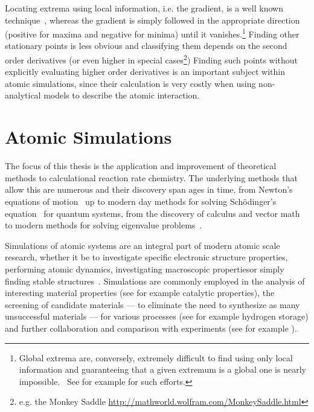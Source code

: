 Locating extrema using local information, i.e. the gradient, is a well known technique~\cite{cg-original-1952}, whereas the gradient is simply followed in the appropriate direction (positive for maxima and negative for minima) until it vanishes.\footnote{Global extrema are, conversely, extremely difficult to find using only local information and guaranteeing that a given extremum is a global one is nearly impossible.~\cite{Stillinger1999} See for example \cite{Wang2010, Wales1999, Pickard2011, Oganov2008, Kirkpatrick1983, Johnston2003, Fischer2006} for such efforts.}
Finding other stationary points is less obvious and classifying them depends on the second order derivatives (or even higher in special cases\footnote{e.g. the Monkey Saddle \url{http://mathworld.wolfram.com/MonkeySaddle.html}})
Finding such points without explicitly evaluating higher order derivatives is an important subject within atomic simulations, since their calculation is very costly when using non-analytical models to describe the atomic interaction.

\section{Atomic Simulations}
The focus of this thesis is the application and improvement of theoretical methods to calculational reaction rate chemistry.
The underlying methods that allow this are numerous and their discovery span ages in time, from Newton's equations of motion~\cite{newton-latin} up to modern day methods for solving Sch\"odinger's equation~\cite{schrodinger-equation-1926} for quantum systems\cite{hohenberg-kohn-1964, gpaw-review-2010, dacapo-1999}, from the discovery of calculus and vector math to modern methods for solving eigenvalue problems~\cite{eigenvalue-problems-2000}.

Simulations of atomic systems are an integral part of modern atomic scale research, whether it be to investigate specific electronic structure properties\citemiss, performing atomic dynamics\citemiss, investigating macroscopic properties\citemiss or simply finding stable structures~\citemiss.
Simulations are commonly employed in the analysis of interesting material properties (see for example catalytic properties\citemiss), the screening of candidate materials --- to eliminate the need to synthesize as many unsuccessful materials --- for various processes (see for example hydrogen storage\cite{summer-school-paper-2009}) and further collaboration and comparison with experiments (see for example \citemiss).

